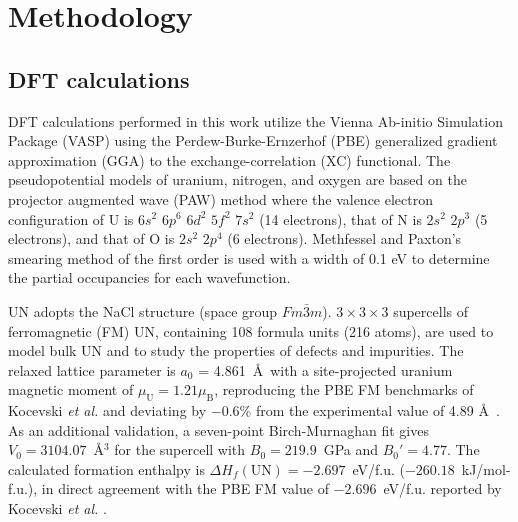 \documentclass[preprint,12pt,sort&compress]{elsarticle}
\newcommand{\?}{\stackrel{?}{=}}
\begin{document}
\section{Methodology}

\subsection{DFT calculations}

DFT calculations performed in this work utilize the Vienna Ab-initio Simulation Package (VASP) \cite{Kresse1993, Kresse1996a, Kresse1996b} using the Perdew-Burke-Ernzerhof (PBE) \cite{Perdew1996} generalized gradient approximation (GGA) to the exchange-correlation (XC) functional. The pseudopotential models of uranium, nitrogen, and oxygen are based on the projector augmented wave (PAW) method \cite{Kresse1999} where the valence electron configuration of U is $6s^2$ $6p^6$ $6d^2$ $5f^2$ $7s^2$ (14 electrons), that of N is $2s^2$ $2p^3$ (5 electrons), and that of O is $2s^2$ $2p^4$ (6 electrons). Methfessel and Paxton’s smearing method \cite{Methfessel1989} of the first order is used with a width of 0.1 eV to determine the partial occupancies for each wavefunction.

UN adopts the NaCl structure (space group $Fm\bar{3}m$). $3 \times 3 \times 3$ supercells of ferromagnetic (FM) UN, containing 108 formula units (216 atoms), are used to model bulk UN and to study the properties of defects and impurities. The relaxed lattice parameter is $a_0$ = 4.861~\AA\ with a site-projected uranium magnetic moment of $\mu_\text{U} = 1.21 \mu_\text{B}$, reproducing the PBE FM benchmarks of Kocevski \textit{et al.} \cite{Kocevski2022I} and deviating by $-0.6$\% from the experimental value of 4.89 \AA\ \cite{Hayes1990I}. As an additional validation, a seven-point Birch-Murnaghan fit gives $V_0 = 3104.07$~\AA$^3$ for the supercell with $B_0 = 219.9$~GPa and $B_0' = 4.77$. The calculated formation enthalpy is $\Delta H_f(\mathrm{UN}) = -2.697$~eV/f.u. ($-260.18$~kJ/mol-f.u.), in direct agreement with the PBE FM value of $-2.696$~eV/f.u. reported by Kocevski \textit{et al.} \cite{Kocevski2022I}.

\end{document}
